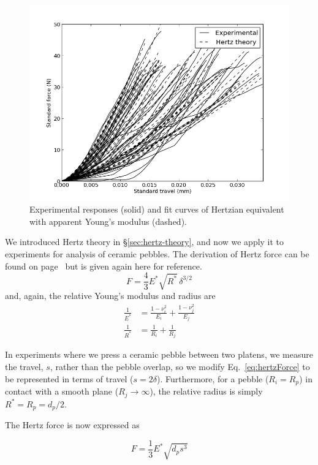 \begin{figure}[t]
  \centering
  \includegraphics[width = 0.75 \textwidth]{chapters/figures/NFRI-exp_v_hertz}
  \caption{Experimental responses (solid) and fit curves of Hertzian equivalent with apparent Young's modulus (dashed).}\label{fig:hertz-exp}
\end{figure}






We introduced Hertz theory in \S\ref{sec:hertz-theory}, and now we apply it to experiments for analysis of ceramic pebbles. The derivation of Hertz force can be found on page~\pageref{eq:hertzForce} but is given again here for reference.
\begin{equation}
        F = \frac{4}{3}E^*\sqrt{R^*}\,\delta^{3/2}
\end{equation}
and, again, the relative Young's modulus and radius are
\begin{align*}
\frac{1}{E^*} & = \frac{1-\nu_i^2}{E_i} + \frac{1-\nu_j^2}{E_j} \\
\frac{1}{R^*} & = \frac{1}{R_i} + \frac{1}{R_j}
\end{align*}

In experiments where we press a ceramic pebble between two platens, we measure the travel, $s$, rather than the pebble overlap, so we modify Eq.~\ref{eq:hertzForce} to be represented in terms of travel ($s = 2\delta$). Furthermore, for a pebble ($R_i = R_p$) in contact with a smooth plane ($R_j \rightarrow \infty$), the relative radius is simply $R^* = R_p = d_p/2$.

The Hertz force is now expressed as

\begin{equation}\label{eq:contact-force}
        F = \frac{1}{3}E^*\sqrt{d_ps^3}
\end{equation}

